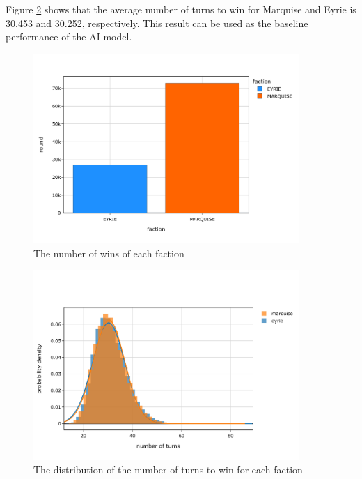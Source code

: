 Figure \ref{fig:introductory-winner-turn-dist} shows that the average number of turns to win for Marquise and Eyrie is 30.453 and 30.252, respectively. This result can be used as the baseline performance of the AI model.

\begin{figure}[h!]
    \begin{center}
      \includegraphics[width=0.9\textwidth]{./images/fig-introductory-win.jpeg}
    \end{center}
    \caption{The number of wins of each faction}
    \label{fig:introductory-win}
\end{figure}

\begin{figure}[h!]
    \begin{center}
      \includegraphics[width=0.9\textwidth]{./images/fig-introductory-winner-turn-dist.jpeg}
    \end{center}
    \caption{The distribution of the number of turns to win for each faction}
    \label{fig:introductory-winner-turn-dist}
\end{figure}

